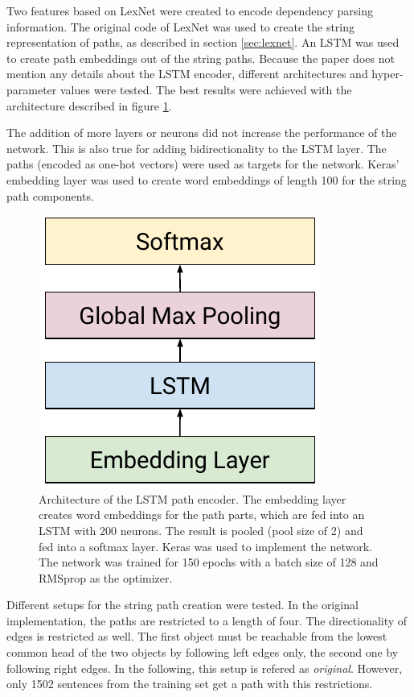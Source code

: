 \label{sec:lexnet_feat_desc}
Two features based on LexNet were created to encode dependency parsing information. The original code of LexNet was used to create the string representation of paths, as described in section \ref{sec:lexnet}. An LSTM was used to create path embeddings out of the string paths. Because the paper does not mention any details about the LSTM encoder, different architectures and hyper-parameter values were tested. The best results were achieved with the architecture described in figure \ref{fig:lexnetnn}.

The addition of more layers or neurons did not increase the performance of the network. This is also true for adding bidirectionality to the LSTM layer. The paths (encoded as one-hot vectors) were used as targets for the network. Keras' embedding layer was used to create word embeddings of length 100 for the string path components.

\begin{figure}[htbp]
\centering
\caption{Architecture of the LSTM path encoder. The embedding layer creates word embeddings for the path parts, which are fed into an LSTM with 200 neurons. The result is pooled (pool size of 2) and fed into a softmax layer. Keras \cite{chollet2015keras} was used to implement the network. The network was trained for 150 epochs with a batch size of 128 and RMSprop as the optimizer.}
\label{fig:lexnetnn}
\includegraphics{images/lex_arch}
\end{figure}



Different setups for the string path creation were tested. In the original implementation, the paths are restricted to a length of four. The directionality of edges is restricted as well. The first object must be reachable from the lowest common head of the two objects by following left edges only, the second one by following right edges. In the following, this setup is refered as \emph{original}. However, only 1502 sentences from the training set get a path with this restrictions. 

